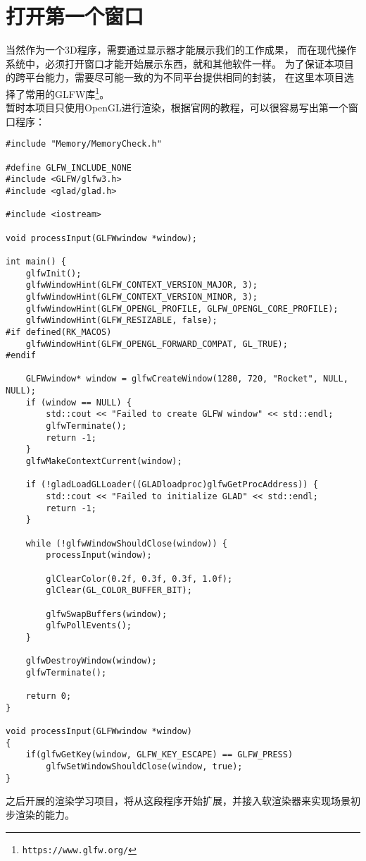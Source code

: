 \section{打开第一个窗口}
当然作为一个3D程序，需要通过显示器才能展示我们的工作成果，
而在现代操作系统中，必须打开窗口才能开始展示东西，就和其他软件一样。
为了保证本项目的跨平台能力，需要尽可能一致的为不同平台提供相同的封装，
在这里本项目选择了常用的GLFW库\footnote{\nolinkurl{https://www.glfw.org/}}。\\

暂时本项目只使用OpenGL进行渲染，根据官网的教程，可以很容易写出第一个窗口程序：

\begin{lstlisting}[style=C++,title={Engine/glfw.cpp}]
#include "Memory/MemoryCheck.h"

#define GLFW_INCLUDE_NONE
#include <GLFW/glfw3.h>
#include <glad/glad.h>

#include <iostream>

void processInput(GLFWwindow *window);

int main() {
	glfwInit();
    glfwWindowHint(GLFW_CONTEXT_VERSION_MAJOR, 3);
    glfwWindowHint(GLFW_CONTEXT_VERSION_MINOR, 3);
    glfwWindowHint(GLFW_OPENGL_PROFILE, GLFW_OPENGL_CORE_PROFILE);
	glfwWindowHint(GLFW_RESIZABLE, false);
#if defined(RK_MACOS)
    glfwWindowHint(GLFW_OPENGL_FORWARD_COMPAT, GL_TRUE);
#endif

	GLFWwindow* window = glfwCreateWindow(1280, 720, "Rocket", NULL, NULL);
	if (window == NULL) {
		std::cout << "Failed to create GLFW window" << std::endl;
		glfwTerminate();
		return -1;
	}
	glfwMakeContextCurrent(window);

	if (!gladLoadGLLoader((GLADloadproc)glfwGetProcAddress)) {
        std::cout << "Failed to initialize GLAD" << std::endl;
        return -1;
    }

	while (!glfwWindowShouldClose(window)) {
        processInput(window);

        glClearColor(0.2f, 0.3f, 0.3f, 1.0f);
        glClear(GL_COLOR_BUFFER_BIT);

        glfwSwapBuffers(window);
        glfwPollEvents();
    }

	glfwDestroyWindow(window);
	glfwTerminate();

    return 0;
}

void processInput(GLFWwindow *window)
{
    if(glfwGetKey(window, GLFW_KEY_ESCAPE) == GLFW_PRESS)
        glfwSetWindowShouldClose(window, true);
}
\end{lstlisting}

之后开展的渲染学习项目，将从这段程序开始扩展，并接入软渲染器来实现场景初步渲染的能力。
